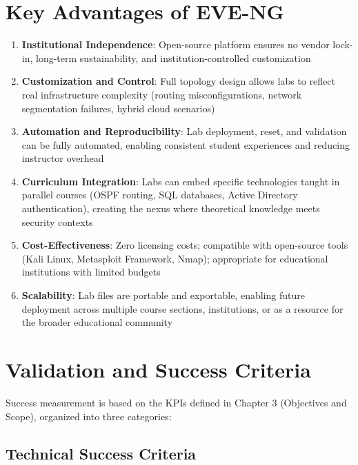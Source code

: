\section{Key Advantages of EVE-NG}

\begin{enumerate}
    \item \textbf{Institutional Independence}: Open-source platform ensures 
          no vendor lock-in, long-term sustainability, and 
          institution-controlled customization
    
    \item \textbf{Customization and Control}: Full topology design allows labs 
          to reflect real infrastructure complexity (routing misconfigurations, 
          network segmentation failures, hybrid cloud scenarios)
    
    \item \textbf{Automation and Reproducibility}: Lab deployment, reset, and 
          validation can be fully automated, enabling consistent student 
          experiences and reducing instructor overhead
    
    \item \textbf{Curriculum Integration}: Labs can embed specific technologies 
          taught in parallel courses (OSPF routing, SQL databases, Active 
          Directory authentication), creating the nexus where theoretical 
          knowledge meets security contexts
    
    \item \textbf{Cost-Effectiveness}: Zero licensing costs; compatible with 
          open-source tools (Kali Linux, Metasploit Framework, Nmap); 
          appropriate for educational institutions with limited budgets
    
    \item \textbf{Scalability}: Lab files are portable and exportable, enabling 
          future deployment across multiple course sections, institutions, 
          or as a resource for the broader educational community
\end{enumerate}


\section{Validation and Success Criteria}

Success measurement is based on the KPIs defined in Chapter 3 (Objectives and Scope), organized into three categories:

\subsection{Technical Success Criteria}

